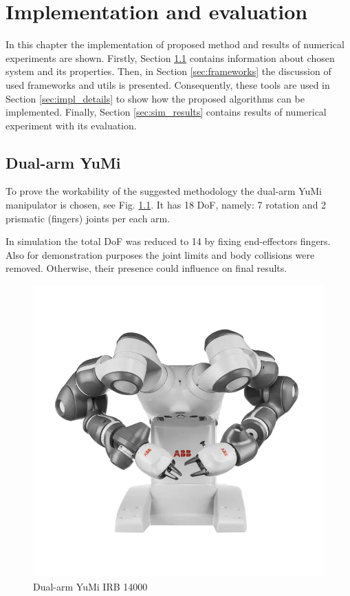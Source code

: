 \chapter{Implementation and evaluation}
\label{chap:impl}

In this chapter the implementation of proposed method and results 
of numerical experiments are shown. Firstly, Section {\ref{sec:dual_arm_yumi}} 
contains information about chosen system and its properties. Then, in Section 
\ref{sec:frameworks} the discussion of used frameworks and utils is presented. 
Consequently, these tools are used in Section \ref{sec:impl_details} to show 
how the proposed algorithms can be implemented. Finally, Section 
\ref{sec:sim_results} contains results of numerical experiment with its 
evaluation.

\section{Dual-arm YuMi}
\label{sec:dual_arm_yumi}

To prove the workability of the suggested methodology the dual-arm YuMi 
manipulator is chosen, see Fig. \ref{fig:dual_arm_yumi}. It has 18 DoF, namely: 
7 rotation and 2 prismatic (fingers) joints per each arm. 

In simulation the total DoF was reduced to 14 by fixing end-effectors fingers. 
Also for demonstration purposes the joint limits and body collisions were 
removed. Otherwise, their presence could influence on final results.

\begin{figure}[H]
    \centering
    \includegraphics[scale=0.25]{figs/yumi.png}
    \caption{Dual-arm YuMi IRB 14000}
    \label{fig:dual_arm_yumi}
\end{figure}

